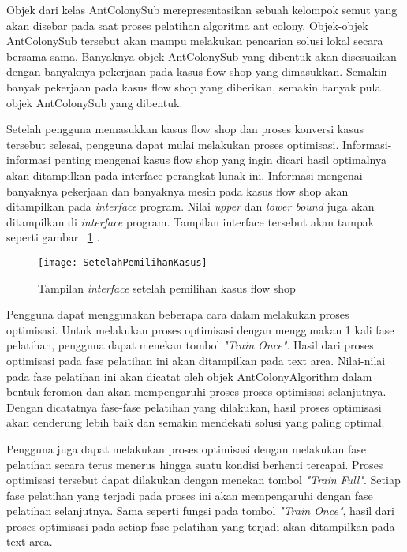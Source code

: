 Objek dari kelas AntColonySub merepresentasikan sebuah kelompok semut yang akan disebar
pada saat proses pelatihan algoritma ant colony. Objek-objek AntColonySub tersebut akan mampu
melakukan pencarian solusi lokal secara bersama-sama. Banyaknya objek AntColonySub yang
dibentuk akan disesuaikan dengan banyaknya pekerjaan pada kasus flow shop yang dimasukkan.
Semakin banyak pekerjaan pada kasus flow shop yang diberikan, semakin banyak
pula objek AntColonySub yang dibentuk.

Setelah pengguna memasukkan kasus flow shop dan proses konversi kasus tersebut selesai,
pengguna dapat mulai melakukan proses optimisasi. Informasi-informasi penting mengenai kasus flow shop yang ingin dicari hasil optimalnya akan ditampilkan pada interface perangkat lunak
ini. Informasi mengenai banyaknya pekerjaan dan banyaknya mesin pada kasus flow shop akan ditampilkan pada \textit{interface} program. Nilai \textit{upper} dan \textit{lower bound} juga akan ditampilkan di \textit{interface} program. Tampilan interface tersebut akan tampak seperti gambar ~\ref{fig:setelahpemilihankasus} .

\begin{figure}[H]
	\centering
	\texttt{[image: SetelahPemilihanKasus]}
	\caption[Tampilan \textit{interface} setelah pemilihan kasus flow shop]{Tampilan \textit{interface} setelah pemilihan kasus flow shop}
	\label{fig:setelahpemilihankasus}
\end{figure}

Pengguna dapat menggunakan beberapa cara dalam melakukan proses optimisasi. Untuk melakukan
proses optimisasi dengan menggunakan 1 kali fase pelatihan, pengguna dapat menekan
tombol \textit{"Train Once"}. Hasil dari proses optimisasi pada fase pelatihan ini akan ditampilkan pada
text area. Nilai-nilai pada fase pelatihan ini akan dicatat oleh objek AntColonyAlgorithm dalam
bentuk feromon dan akan mempengaruhi proses-proses optimisasi selanjutnya. Dengan dicatatnya
fase-fase pelatihan yang dilakukan, hasil proses optimisasi akan cenderung lebih baik dan semakin
mendekati solusi yang paling optimal.

Pengguna juga dapat melakukan proses optimisasi dengan melakukan fase pelatihan secara terus
menerus hingga suatu kondisi berhenti tercapai. Proses optimisasi tersebut dapat dilakukan dengan
menekan tombol \textit{"Train Full"}. Setiap fase pelatihan yang terjadi pada proses ini akan mempengaruhi
dengan fase pelatihan selanjutnya. Sama seperti fungsi pada tombol \textit{"Train Once"}, hasil dari proses
optimisasi pada setiap fase pelatihan yang terjadi akan ditampilkan pada text area.

